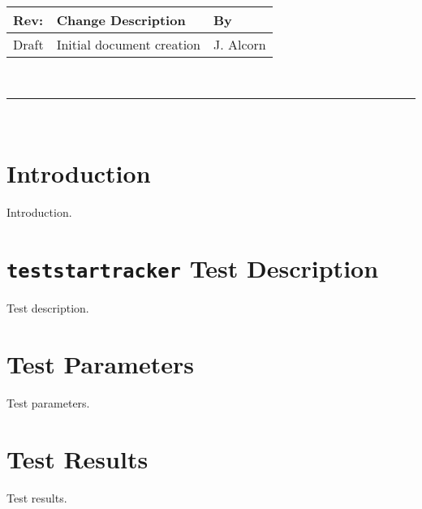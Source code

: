 \documentclass[]{BasiliskReportMemo}
\begin{document}
\makeCover


%
%
\pagestyle{empty}
{\renewcommand{\arraystretch}{1.1}
\noindent
\begin{longtable}{|p{0.5in}|p{4.5in}|p{1.14in}|}
\hline
{\bfseries Rev}: & {\bfseries Change Description} & {\bfseries By} \\
\hline
Draft & Initial document creation & J. Alcorn \\
\hline

\end{longtable}
}

\newpage
\setcounter{page}{1}
\pagestyle{fancy}

\tableofcontents
~\\ \hrule ~\\


\section{Introduction}
Introduction.

\section{{\tt test\textunderscore star\textunderscore tracker} Test Description}
Test description.

\section{Test Parameters}
Test parameters.

\section{Test Results}
Test results.
\end{document}
